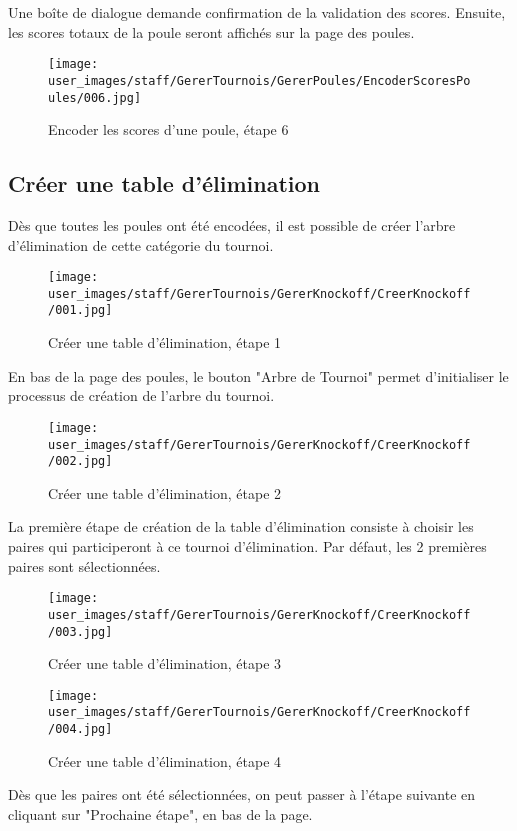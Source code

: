 Une boîte de dialogue demande confirmation de la validation des scores. Ensuite, les scores totaux de la poule seront affichés sur la page des poules.

\begin{figure}[H]
\centering
\texttt{[image: user\_images/staff/GererTournois/GererPoules/EncoderScoresPoules/006.jpg]}
\caption{Encoder les scores d'une poule, étape 6}
\end{figure}

\subsection{Créer une table d'élimination}

Dès que toutes les poules ont été encodées, il est possible de créer l'arbre d'élimination de cette catégorie du tournoi.

\begin{figure}[H]
\centering
\texttt{[image: user\_images/staff/GererTournois/GererKnockoff/CreerKnockoff/001.jpg]}
\caption{Créer une table d'élimination, étape 1}
\end{figure}

En bas de la page des poules, le bouton "Arbre de Tournoi" permet d'initialiser le processus de création de l'arbre du tournoi.

\begin{figure}[H]
\centering
\texttt{[image: user\_images/staff/GererTournois/GererKnockoff/CreerKnockoff/002.jpg]}
\caption{Créer une table d'élimination, étape 2}
\end{figure}

La première étape de création de la table d'élimination consiste à choisir les paires qui participeront à ce tournoi d'élimination. Par défaut, les 2 premières paires sont sélectionnées.

\begin{figure}[H]
\centering
\texttt{[image: user\_images/staff/GererTournois/GererKnockoff/CreerKnockoff/003.jpg]}
\caption{Créer une table d'élimination, étape 3}
\end{figure}

\begin{figure}[H]
\centering
\texttt{[image: user\_images/staff/GererTournois/GererKnockoff/CreerKnockoff/004.jpg]}
\caption{Créer une table d'élimination, étape 4}
\end{figure}

Dès que les paires ont été sélectionnées, on peut passer à l'étape suivante en cliquant sur "Prochaine étape", en bas de la page.

